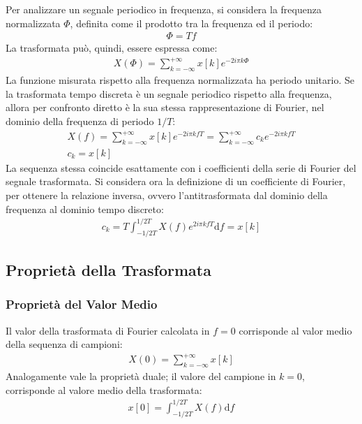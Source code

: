 \documentclass{article}
\newcommand{\df}{\mathrm{d}}
\numberwithin{equation}{subsection}
\begin{document}
Per analizzare un segnale periodico in frequenza, si considera la frequenza normalizzata $\Phi$, definita come il prodotto tra la frequenza ed il periodo:
\begin{gather}
    \Phi=Tf
\end{gather}
La trasformata può, quindi, essere espressa come:
\begin{gather}
    X(\Phi)=\displaystyle\sum_{k=-\infty}^{+\infty}x[k]e^{-2i\pi k\Phi}
\end{gather}
La funzione misurata rispetto alla frequenza normalizzata ha periodo unitario. 
Se la trasformata tempo discreta è un segnale periodico rispetto alla frequenza, allora per confronto diretto è la sua stessa rappresentazione di Fourier, nel dominio della 
frequenza di periodo $1/T$:
\begin{gather*}
    X(f)=\displaystyle\sum_{k=-\infty}^{+\infty}x[k]e^{-2i\pi kfT}=\sum_{k=-\infty}^{+\infty}c_ke^{-2i\pi kfT}\\
    c_k=x[k]
\end{gather*}
La sequenza stessa coincide esattamente con i coefficienti della serie di Fourier del segnale trasformata. Si considera ora la definizione di un coefficiente di Fourier, 
per ottenere la relazione inversa, ovvero l'antitrasformata dal dominio della frequenza al dominio tempo discreto:
\begin{gather}
    c_k=\displaystyle T\int_{-1/2T}^{1/2T}X(f)e^{2i\pi kfT}\df f=x[k]
\end{gather}

\subsection{Proprietà della Trasformata}

\subsubsection{Proprietà del Valor Medio}

Il valor della trasformata di Fourier calcolata in $f=0$ corrisponde al valor medio della sequenza di campioni:
\begin{gather}
    X(0)=\displaystyle\sum_{k=-\infty}^{+\infty}x[k]
\end{gather}
Analogamente vale la proprietà duale; il valore del campione in $k=0$, corrisponde al valore medio della trasformata:
\begin{gather}
    x[0]=\displaystyle\int_{-1/2T}^{1/2T}X(f)\df f
\end{gather}
\end{document}
